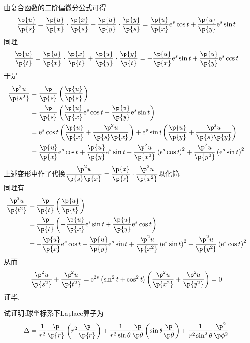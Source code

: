 \documentclass{ctexart}
\begin{document}
\begin{solution}[Proof.]
    由复合函数的二阶偏微分公式可得
    $$\dfrac{\p{u}}{\p{s}}=\dfrac{\p{u}}{\p{x}}\cdot\dfrac{\p{x}}{\p{s}}+\dfrac{\p{u}}{\p{y}}\cdot\dfrac{\p{y}}{\p{s}}=\dfrac{\p{u}}{\p{x}}\e^s\cos t+\dfrac{\p{u}}{\p{y}}\e^s\sin t$$
    同理
    $$\dfrac{\p{u}}{\p{t}}=\dfrac{\p{u}}{\p{x}}\cdot\dfrac{\p{x}}{\p{t}}+\dfrac{\p{u}}{\p{y}}\cdot\dfrac{\p{y}}{\p{t}}=-\dfrac{\p{u}}{\p{x}}\e^s\sin t+\dfrac{\p{u}}{\p{y}}\e^s\cos t$$
    于是
    $$\begin{aligned}
        \dfrac{\p^2u}{\p{s^2}}
        &= \dfrac{\p}{\p{s}}\left(\dfrac{\p{u}}{\p{s}}\right) \\
        &= \dfrac{\p}{\p{s}}\left(\dfrac{\p{u}}{\p{x}}\e^s\cos t+\dfrac{\p{u}}{\p{y}}\e^s\sin t\right) \\
        &= \e^s\cos t\left(\dfrac{\p{u}}{\p{x}}+\dfrac{\p^2u}{\p{s}\p{x}}\right)+\e^s\sin t\left(\dfrac{\p{u}}{\p{y}}+\dfrac{\p^2u}{\p{s}\p{y}}\right) \\
        &= \dfrac{\p{u}}{\p{x}}\e^s\cos t+\dfrac{\p{u}}{\p{y}}\e^s\sin t+\dfrac{\p^2{u}}{\p{x^2}}\left(\e^s\cos t\right)^2+\dfrac{\p^2{u}}{\p{y^2}}\left(\e^s\sin t\right)^2
    \end{aligned}$$
    上述变形中作了代换$\displaystyle\dfrac{\p^2u}{\p{s}\p{x}}=\dfrac{\p{x}}{\p{s}}\cdot\dfrac{\p^2u}{\p{x^2}}$以化简.\\
    同理有
    $$\begin{aligned}
        \dfrac{\p^2u}{\p{t^2}}
        &= \dfrac{\p}{\p{t}}\left(\dfrac{\p{u}}{\p{t}}\right) \\
        &= \dfrac{\p}{\p{t}}\left(-\dfrac{\p{u}}{\p{x}}\e^s\sin t+\dfrac{\p{u}}{\p{y}}\e^s\cos t\right) \\
        &= -\dfrac{\p{u}}{\p{x}}\e^s\cos t-\dfrac{\p{u}}{\p{y}}\e^s\sin t+\dfrac{\p^2{u}}{\p{x^2}}\left(\e^s\sin t\right)^2+\dfrac{\p^2{u}}{\p{y^2}}\left(\e^s\cos t\right)^2
    \end{aligned}$$
    从而
    $$\dfrac{\p^2u}{\p{s^2}}+\dfrac{\p^2u}{\p{t^2}}=\e^{2s}\left(\sin^2t+\cos^2t\right)\left(\dfrac{\p^2u}{\p{x^2}}+\dfrac{\p^2u}{\p{y^2}}\right)=0$$
    证毕.
\end{solution}
\begin{problem}[Example 3.2]
    试证明:球坐标系下Laplace算子为
    $$\Delta=\dfrac{1}{r^2}\dfrac{\p}{\p{r}}\left(r^2\dfrac{\p}{\p{r}}\right)+\dfrac{1}{r^2\sin\theta}\dfrac{\p}{\p\theta}\left(\sin\theta\dfrac{\p}{\p\theta}\right)+\dfrac{1}{r^2\sin^2\theta}\dfrac{\p^2}{\p\phi^2}$$
\end{problem}
\end{document}

